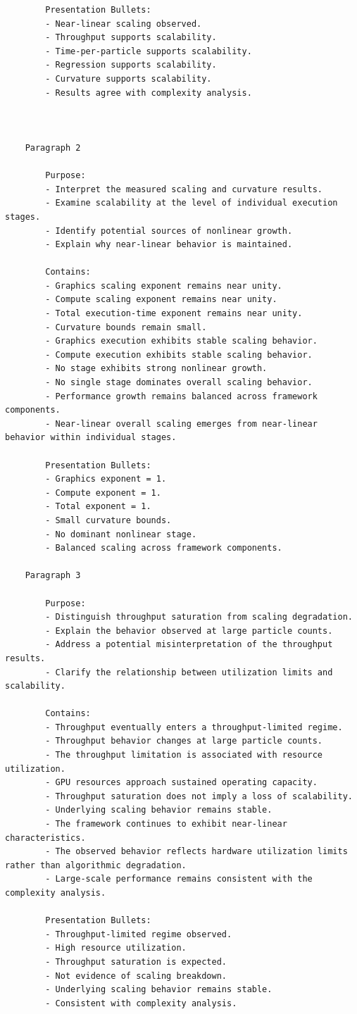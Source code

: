 \begin{verbatim}
		Presentation Bullets:
		- Near-linear scaling observed.
		- Throughput supports scalability.
		- Time-per-particle supports scalability.
		- Regression supports scalability.
		- Curvature supports scalability.
		- Results agree with complexity analysis.



	Paragraph 2

		Purpose:
		- Interpret the measured scaling and curvature results.
		- Examine scalability at the level of individual execution stages.
		- Identify potential sources of nonlinear growth.
		- Explain why near-linear behavior is maintained.

		Contains:
		- Graphics scaling exponent remains near unity.
		- Compute scaling exponent remains near unity.
		- Total execution-time exponent remains near unity.
		- Curvature bounds remain small.
		- Graphics execution exhibits stable scaling behavior.
		- Compute execution exhibits stable scaling behavior.
		- No stage exhibits strong nonlinear growth.
		- No single stage dominates overall scaling behavior.
		- Performance growth remains balanced across framework components.
		- Near-linear overall scaling emerges from near-linear behavior within individual stages.

		Presentation Bullets:
		- Graphics exponent = 1.
		- Compute exponent = 1.
		- Total exponent = 1.
		- Small curvature bounds.
		- No dominant nonlinear stage.
		- Balanced scaling across framework components.

	Paragraph 3

		Purpose:
		- Distinguish throughput saturation from scaling degradation.
		- Explain the behavior observed at large particle counts.
		- Address a potential misinterpretation of the throughput results.
		- Clarify the relationship between utilization limits and scalability.

		Contains:
		- Throughput eventually enters a throughput-limited regime.
		- Throughput behavior changes at large particle counts.
		- The throughput limitation is associated with resource utilization.
		- GPU resources approach sustained operating capacity.
		- Throughput saturation does not imply a loss of scalability.
		- Underlying scaling behavior remains stable.
		- The framework continues to exhibit near-linear characteristics.
		- The observed behavior reflects hardware utilization limits rather than algorithmic degradation.
		- Large-scale performance remains consistent with the complexity analysis.

		Presentation Bullets:
		- Throughput-limited regime observed.
		- High resource utilization.
		- Throughput saturation is expected.
		- Not evidence of scaling breakdown.
		- Underlying scaling behavior remains stable.
		- Consistent with complexity analysis.


\end{verbatim}
